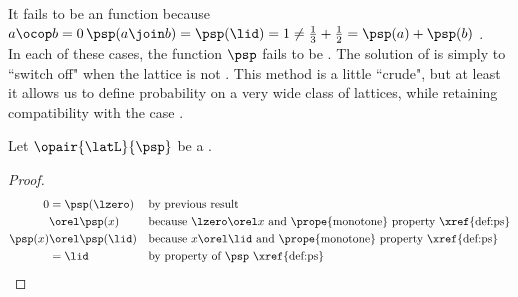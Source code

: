 \begin{remark}
It fails to be an  function because 
\\\indentx$a\ocop b=0$\qquad$\psp(a\join b)=\psp(\lid)=1\neq\frac{1}{3}+\frac{1}{2}=\psp(a)+\psp(b)$ .\\
In each of these cases, the function $\psp$ fails to be .
The solution of  is simply to ``switch off"  when the lattice is not .
This method is a little ``crude", but at least it allows us to define probability on a very wide class of lattices,
while retaining compatibility with the  case .
\end{remark}

\begin{proposition}
\label{prop:ps_01}
Let $\opair{\latL}{\psp}$ be a  .
\end{proposition}
\begin{proof}
  \begin{align*}
    0
      &= \psp(\lzero)
      && \text{by previous result}
    \\&\orel \psp(x)
      && \text{because $\lzero\orel x$ and \prope{monotone} property \xref{def:ps}}
    \\
    \psp(x)
      &\orel \psp(\lid)
      && \text{because $x\orel\lid$ and \prope{monotone} property \xref{def:ps}}
    \\&= \lid
      && \text{by property of $\psp$ \xref{def:ps}}
  \end{align*}
\end{proof}

